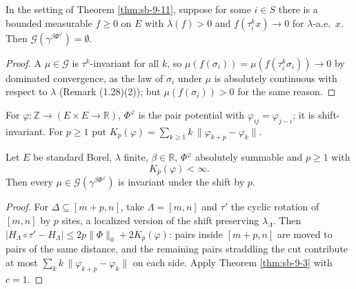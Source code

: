 \begin{corollary}[Georgii (9.16)]
    \label{cor:sb-9-16}
    \leanok

    In the setting of Theorem \ref{thm:sb-9-11}, suppose for some $i \in S$ there is a bounded
    measurable $f \geq 0$ on $E$ with $\lambda(f) > 0$ and $f(\tau_i^k x) \to 0$ for
    $\lambda$-a.e.\ $x$. Then $\mathcal G(\gamma^{\beta\Phi^\varphi}) = \emptyset$.
\end{corollary}
\begin{proof}
    \leanok
    A $\mu \in \mathcal G$ is $\tau^k$-invariant for all $k$, so $\mu(f(\sigma_i)) =
    \mu(f(\tau_i^k \sigma_i)) \to 0$ by dominated convergence, as the law of $\sigma_i$ under
    $\mu$ is absolutely continuous with respect to $\lambda$ (Remark (1.28)(2)); but
    $\mu(f(\sigma_i)) > 0$ for the same reason.
\end{proof}

\begin{definition}
    \label{def:sb-pair-shift}
    \leanok

    For $\varphi \colon \mathbb Z \to (E \times E \to \mathbb R)$, $\Phi^\varphi$ is the pair
    potential with $\varphi_{ij} = \varphi_{j-i}$; it is shift-invariant. For $p \geq 1$ put
    $K_p(\varphi) = \sum_{k \geq 1} k\,\|\varphi_{k+p} - \varphi_k\|$.
\end{definition}

\begin{theorem}[Georgii (9.5)]
    \label{thm:sb-9-5}
    \leanok

    Let $E$ be standard Borel, $\lambda$ finite, $\beta \in \mathbb R$, $\Phi^\varphi$ absolutely
    summable and $p \geq 1$ with
    \[
        K_p(\varphi) < \infty . \tag{9.6}
    \]
    Then every $\mu \in \mathcal G(\gamma^{\beta\Phi^\varphi})$ is invariant under the shift by
    $p$.
\end{theorem}
\begin{proof}
    \leanok
    For $\Delta \subseteq [m + p, n]$, take $\Lambda = [m, n]$ and $\tau'$ the cyclic rotation
    of $[m,n]$ by $p$ sites, a localized version of the shift preserving $\lambda_\Lambda$. Then
    $|H_\Lambda \circ \tau' - H_\Lambda| \leq 2p\|\Phi\|_0 + 2 K_p(\varphi)$: pairs inside
    $[m+p, n]$ are moved to pairs of the same distance, and the remaining pairs straddling the cut
    contribute at most $\sum_{k} k\,\|\varphi_{k+p} - \varphi_k\|$ on each side. Apply Theorem
    \ref{thm:sb-9-3} with $c = 1$.
\end{proof}

